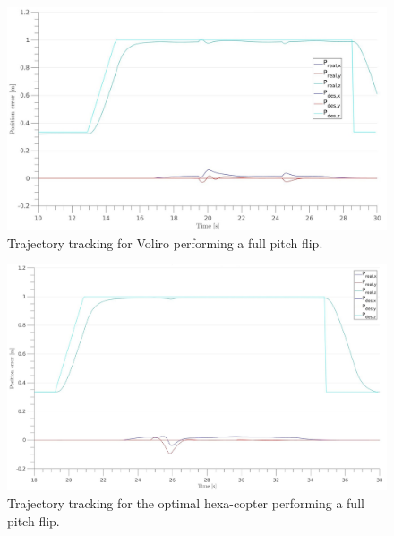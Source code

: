 \begin{figure}[!ht]
  \begin{center}
    \includegraphics[width=1.0\linewidth]{images/Voliro_pitch_position.jpg}
    \caption{Trajectory tracking for Voliro performing a full pitch flip.}
    \label{fig:Voliro_position_pitch}
  \end{center}
\end{figure}

\begin{figure}[!ht]
  \begin{center}
    \includegraphics[width=1.0\linewidth]{images/Hexa_pitch_position.jpg}
    \caption{Trajectory tracking for the optimal hexa-copter performing a full pitch flip.}
    \label{fig:Hexa_position_pitch}
  \end{center}
\end{figure}

